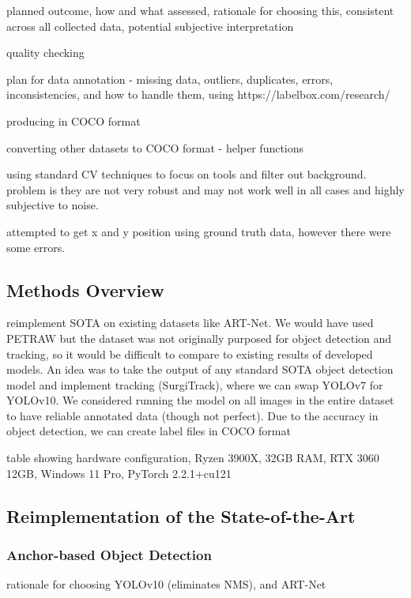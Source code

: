 planned outcome, how and what assessed, rationale for choosing this, consistent across all collected data, potential subjective interpretation

quality checking

plan for data annotation - missing data, outliers, duplicates, errors, inconsistencies, and how to handle them, using https://labelbox.com/research/

producing in COCO format

converting other datasets to COCO format - helper functions

using standard CV techniques to focus on tools and filter out background. problem is they are not very robust and may not work well in all cases and highly subjective to noise.

attempted to get x and y position using ground truth data, however there were some errors.

\subsection{Methods Overview}

reimplement SOTA on existing datasets like ART-Net. We would have used PETRAW but the dataset was not originally purposed for object detection and tracking, so it would be difficult to compare to existing results of developed models. An idea was to take the output of any standard SOTA object detection model and implement tracking (SurgiTrack), where we can swap YOLOv7 for YOLOv10. We considered running the model on all images in the entire dataset to have reliable annotated data (though not perfect). Due to the accuracy in object detection, we can create label files in COCO format

table showing hardware configuration, Ryzen 3900X, 32GB RAM, RTX 3060 12GB, Windows 11 Pro, PyTorch 2.2.1+cu121

\subsection{Reimplementation of the State-of-the-Art}

\subsubsection{Anchor-based Object Detection}

rationale for choosing YOLOv10 (eliminates NMS), and ART-Net


